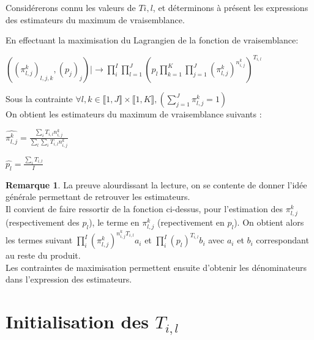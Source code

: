 \documentclass[frenchb]{report}
\newcommand{\1}{\mathbbm{1}}
\theoremstyle{definition}\newtheorem{defn}{Définition}
\theoremstyle{definition}\newtheorem{exm}{Exemple}
\theoremstyle{definition}\newtheorem{nota}{Notation}
\theoremstyle{definition}\newtheorem{rem}{Remarque}
\begin{document}
\newpage

Considérerons connu les valeurs de $T{i,l}$, et déterminons à présent les expressions des estimateurs du maximum de vraisemblance.
\bigskip

En effectuant la maximisation du Lagrangien de la fonction de vraisemblance: 

\begin{center}
	$\left( \left(\pi^k_{l,j}\right)_{l,j,k},(p_j)_j \right) |  \!\!\! \longrightarrow \displaystyle \prod_i^I \displaystyle \prod_{l=1}^J \left( p_l \displaystyle \prod_{k=1}^K \displaystyle \prod_{j = 1}^J \left(\pi^k_{l,j}\right)^{n^k_{i,j}} \right)^{T_{i,l}}$
\end{center}

Sous la contrainte $\forall l,k \in  \llbracket 1,J \rrbracket \times  \llbracket 1,K \rrbracket, \left(\displaystyle \sum_{j = 1}^J \pi^k_{l,j} = 1 \right)$\\

On obtient les estimateurs du maximum de vraisemblance suivants : \\

\begin{center} 
	$\widehat{\pi^{k}_{l,j}} = \displaystyle \frac{\displaystyle \sum_i T_{i,l} n^k_{i,j}}{\displaystyle \sum_l \displaystyle \sum_i T_{i,l} n^k_{i,j}}$
\end{center}
\begin{center}
	$\widehat{p_l} = \displaystyle \frac{\displaystyle \sum_i T_{i,l}}{I}$
\end{center}

\begin{rem}
	La preuve alourdissant la lecture, on se contente de donner l'idée générale permettant de retrouver les estimateurs. \\
Il convient de faire ressortir de la fonction ci-dessus, pour l'estimation des $\pi^k_{l,j}$ (respectivement des $p_l$), le terme en $\pi^k_{l,j}$ (repectivement en $p_l$). On obtient alors les termes suivant $\displaystyle \prod_i^I \left(\pi^k_{l,j}\right)^{n^k_{i,j}T_{i,l}} a_i$ et $\displaystyle \prod_i^I (p_l)^{T_{i,l}} b_i$ avec $a_i$ et $b_i$ correspondant au reste du produit.\\
Les contraintes de maximisation permettent ensuite d'obtenir les dénominateurs dans l'expression des estimateurs. 
\end{rem}
\bigskip
\bigskip
\bigskip





\section{Initialisation des $T_{i,l}$}
\end{document}
